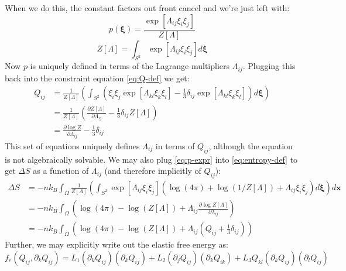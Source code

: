 \documentclass[reqno]{article}
\begin{document}
	When we do this, the constant factors out front cancel and we're just left with:
	\begin{equation} \label{eq:p-expr}
		p( \mathbf{\xi} )
		= \frac{\exp\left[ \Lambda_{ij} \xi_i \xi_j \right]}{Z\left[\Lambda\right]}
	\end{equation}
	\begin{equation}
		Z\left[\Lambda\right]
		= \int_{S^2} \exp[\Lambda_{ij} \xi_i \xi_j] d\mathbf{\xi}
	\end{equation}
	Now $p$ is uniquely defined in terms of the Lagrange multipliers $\Lambda_{ij}$.
	Plugging this back into the constraint equation \eqref{eq:Q-def} we get:
	\begin{equation}
	\begin{split}
		Q_{ij} 
		&= \frac{1}{Z[\Lambda]} \left( 
		\int_{S^2} \left( \xi_i \xi_j \exp[\Lambda_{kl} \xi_k \xi_l]
		- \tfrac13 \delta_{ij} \exp[\Lambda_{kl} \xi_k \xi_l] \right)
		d \mathbf{\xi} \right) \\
		&= \frac{1}{Z[\Lambda]} \left(
		\frac{\partial Z[\Lambda]}{\partial \Lambda_{ij}} - \tfrac13 \delta_{ij} Z[\Lambda]
		\right) \\
		&= \frac{\partial \log Z}{\partial \Lambda_{ij}} - \tfrac13 \delta_{ij}
	\end{split}
	\end{equation}
	This set of equations uniquely defines $\Lambda_{ij}$ in terms of $Q_{ij}$, although the equation is not algebraically solvable.
	We may also plug \eqref{eq:p-expr} into \eqref{eq:entropy-def} to get $\Delta S$ as a function of $\Lambda_{ij}$ (and therefore implicitly of $Q_{ij}$):
	\begin{equation}
	\begin{split}
		\Delta S
		&= -n k_B \int_{\Omega} \frac{1}{Z[\Lambda]} \left(
		\int_{S^2} \exp[\Lambda_{ij} \xi_i \xi_j]
		\left(\log(4\pi) + \log(1 / Z[\Lambda]) + \Lambda_{ij} \xi_i \xi_j\right) d \mathbf{\xi}
		\right) d\mathbf{x} \\
		&= -n k_B \int_{\Omega} \left(
		\log(4 \pi) - \log(Z[\Lambda])
		+ \Lambda_{ij} \frac{\partial \log Z[\Lambda]}{\partial \lambda_{ij}}
		\right) \\
		&= -n k_B \int_{\Omega} \left(
		\log(4 \pi) - \log(Z[\Lambda])
		+ \Lambda_{ij} \left( Q_{ij} + \tfrac13	 \delta_{ij} \right)
		\right)
	\end{split}
	\end{equation}
	Further, we may explicitly write out the elastic free energy as:
	\begin{equation}
		f_e (Q_{ij}, \partial_k Q_{ij})
		= L_1 \left(\partial_k Q_{ij}\right) \left(\partial_k Q_{ij}\right)
		+ L_2 \left(\partial_j Q_{ij}\right) \left(\partial_k Q_{ik}\right)
		+ L_3 Q_{kl} \left(\partial_k Q_{ij}\right) \left(\partial_l Q_{ij}\right)
	\end{equation}
	
\end{document}
